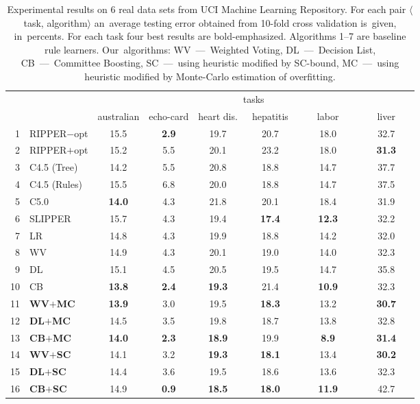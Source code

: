 \documentclass{article}
\begin{document}
\begin{table}[t]
    \def\r#1{\textbf{#1}}
    \caption{Experimental results on 6 real data sets from UCI Machine Learning Repository.
        For each pair $\langle$task, algorithm$\rangle$
        an~average testing error obtained from 10-fold cross validation is~given, in~percents.
        For each task four best results are bold-emphasized.
        Algorithms 1--7 are baseline rule learners.
        Our~algorithms:
        WV~---~Weighted Voting,\;
        DL~---~Decision List,\;
        CB~---~Committee Boosting,\;
        SC~---~using heuristic modified by SC-bound,\;
        MC~---~using heuristic modified by Monte-Carlo estimation of overfitting.
    }
    \label{tab:Experiment}
    \medskip\centering
    \begin{tabular}{|r|l||c|c|c|c|c|c|}
        \hline
        && \multicolumn{6}{c|}{tasks} \\
        \cline{3-8}
        & \raisebox{1.2ex}{algorithms}
                & australian  & echo-card  & heart dis.   & ~hepatitis~   & ~~~labor~~~   & ~~~liver~~~  \\
        \hline
        1& RIPPER$-$opt &15.5&\r{2.9}&19.7&20.7&18.0&32.7\\
        \hline
        2& RIPPER$+$opt &15.2&5.5&20.1&23.2&18.0&\r{31.3}\\
        \hline
        3& C4.5 (Tree) &14.2&5.5&20.8&18.8&14.7&37.7\\
        \hline
        4& C4.5 (Rules)&15.5&6.8&20.0&18.8&14.7&37.5\\
        \hline
        5& C5.0       &\r{14.0}&4.3&21.8&20.1&18.4&31.9\\
        \hline
        6& SLIPPER    &15.7&4.3&19.4&\r{17.4}&\r{12.3}&32.2\\
        \hline
        7& LR         &14.8&4.3&19.9&18.8&14.2&32.0\\
        \hline
        \hline
        8& WV         &14.9&4.3&20.1&19.0&14.0&32.3\\
        \hline
        9& DL         &15.1&4.5&20.5&19.5&14.7&35.8\\
        \hline
        10& CB        &\r{13.8}&\r{2.4}&\r{19.3}&21.4&\r{10.9}&32.3 \\
        \hline
        \hline
        11& \r{WV$+$MC}      &\r{13.9}&3.0&19.5&\r{18.3}&13.2&\r{30.7}\\
        \hline
        12& \r{DL$+$MC}      &14.5&3.5&19.8&18.7&13.8&32.8\\
        \hline
        13& \r{CB$+$MC}      &\r{14.0}&\r{2.3}&\r{18.9}&19.9&\r{8.9}&\r{31.4}\\
        \hline
        \hline
        14& \r{WV$+$SC}     &14.1&3.2&\r{19.3}&\r{18.1}&13.4&\r{30.2}\\
        \hline
        15& \r{DL$+$SC}     &14.4&3.6&19.5&18.6&13.6&32.3\\
        \hline
        16&  \r{CB$+$SC}     &14.9&\r{0.9}&\r{18.5}&\r{18.0}&\r{11.9}&42.7\\
        \hline
    \end{tabular}
\end{table}
\end{document}
